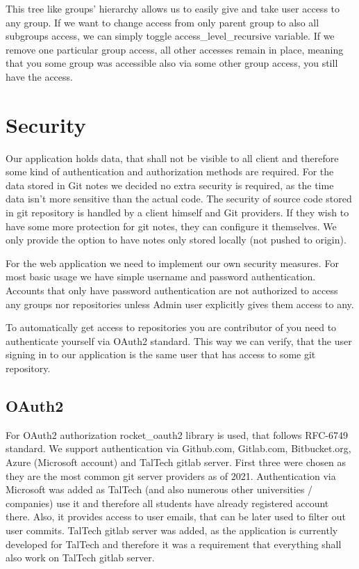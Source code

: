 This tree like groups' hierarchy allows us to easily give and take user access to any group.
If we want to change access from only parent group to also all subgroups access, we can simply toggle access{\_}level{\_}recursive
variable.
If we remove one particular group access, all other accesses remain in place, meaning that you some group was accessible
also via some other group access, you still have the access.

\section{Security}\label{sec:scurity}
Our application holds data, that shall not be visible to all client and therefore some kind of authentication and authorization methods are required.
For the data stored in Git notes we decided no extra security is required, as the time data isn't more sensitive than the actual code.
The security of source code stored in git repository is handled by a client himself and Git providers.
If they wish to have some more protection for git notes, they can configure it themselves.
We only provide the option to have notes only stored locally (not pushed to origin).

For the web application we need to implement our own security measures.
For most basic usage we have simple username and password authentication.
Accounts that only have password authentication are not authorized to access any groups nor repositories unless Admin user
explicitly gives them access to any.

To automatically get access to repositories you are contributor of you need to authenticate yourself via OAuth2 standard.
This way we can verify, that the user signing in to our application is the same user that has access to some git repository.

\subsection{OAuth2}\label{subsec:oauth2}
For OAuth2 authorization rocket{\_}oauth2 library is used, that follows RFC-6749 standard.
\cite{rocket-oauth2, oauth2}
We support authentication via Github.com, Gitlab.com, Bitbucket.org, Azure (Microsoft account) and TalTech gitlab server.
First three were chosen as they are the most common git server providers as of 2021.
Authentication via Microsoft was added as TalTech (and also numerous other universities / companies) use it and therefore
all students have already registered account there.
Also, it provides access to user emails, that can be later used to filter out user commits.
TalTech gitlab server was added, as the application is currently developed for TalTech and therefore it was a requirement
that everything shall also work on TalTech gitlab server.

